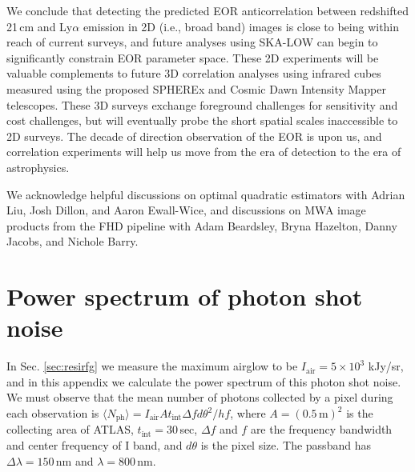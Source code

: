 \documentclass[numberedappendix]{emulateapj}
\begin{document}
We conclude that detecting the predicted EOR anticorrelation between redshifted 21\,cm and Ly$\alpha$ emission in 2D (i.e., broad band) images is close to being within reach of current surveys, and future analyses using SKA-LOW can begin to significantly constrain EOR parameter space. These 2D experiments will be valuable complements to future 3D correlation analyses using infrared cubes measured using the proposed SPHEREx and Cosmic Dawn Intensity Mapper telescopes. These 3D surveys exchange foreground challenges for sensitivity and cost challenges, but will eventually probe the short spatial scales inaccessible to 2D surveys. The decade of direction observation of the EOR is upon us, and correlation experiments will help us move from the era of detection to the era of astrophysics.

\begin{acknowledgments}
We acknowledge helpful discussions on optimal quadratic estimators with Adrian Liu, Josh Dillon, and Aaron Ewall-Wice, and discussions on MWA image products from the FHD pipeline with Adam Beardsley, Bryna Hazelton, Danny Jacobs, and Nichole Barry. 
\end{acknowledgments}

\appendix

\section{Power spectrum of photon shot noise}
\label{sec:Pshot}

In Sec. \ref{sec:resirfg} we measure the maximum airglow to be $I_\text{air}=5\times10^3$ kJy/sr, and in this appendix we calculate the power spectrum of this photon shot noise. We must observe that the mean number of photons collected by a pixel during each observation is $\langle N_\text{ph}\rangle=I_\text{air}At_\text{int} \Delta f d\theta^2/hf$, where $A=(0.5\,\text{m})^2$ is the collecting area of ATLAS, $t_\text{int}=30\,$sec, $\Delta f$ and $f$ are the frequency bandwidth and center frequency of I band, and $d\theta$ is the pixel size. The passband has $\Delta\lambda=150\,$nm and $\lambda=800\,$nm. 
\end{document}
